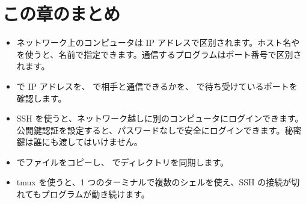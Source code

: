 \section*{この章のまとめ}

\begin{itemize}
  \item ネットワーク上のコンピュータは IP アドレスで区別されます。ホスト名や  を使うと、名前で指定できます。通信するプログラムはポート番号で区別されます。
  \item {} で IP アドレスを、 で相手と通信できるかを、 で待ち受けているポートを確認します。
  \item SSH を使うと、ネットワーク越しに別のコンピュータにログインできます。公開鍵認証を設定すると、パスワードなしで安全にログインできます。秘密鍵は誰にも渡してはいけません。
  \item {} でファイルをコピーし、 でディレクトリを同期します。
  \item tmux を使うと、1 つのターミナルで複数のシェルを使え、SSH の接続が切れてもプログラムが動き続けます。
\end{itemize}
